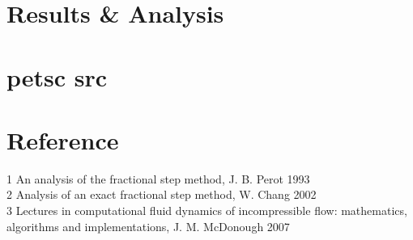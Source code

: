 \documentclass[11pt]{article}
\begin{document}
\section{Results \& Analysis}


\section{petsc src}

\section {Reference}
1 An analysis of the fractional step method, J. B. Perot 1993
\\ 2 Analysis of an exact fractional step method, W. Chang 2002
\\ 3 Lectures in computational fluid dynamics of incompressible flow: mathematics, algorithms and implementations, J. M. McDonough 2007
\end{document}
